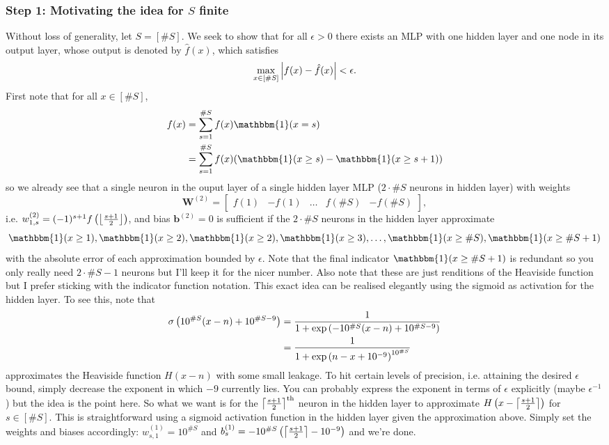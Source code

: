 \documentclass[11pt]{article}
\begin{document}
\subsubsection*{Step 1: Motivating the idea for $S$ finite}
Without loss of generality, let $S=[\#S]$. We seek to show that for all $\epsilon>0$ there exists an MLP with one hidden layer and one node in its output layer, whose output is denoted by $\hat{f}(x)$, which satisfies
$$
\max_{x\in [\#S]}\left|f(x)-\hat{f}(x)\right|<\epsilon.
$$
First note that for all $x\in[\#S]$,
\begin{align*}
f(x)
&=
\sum_{s=1}^{\#S}f(x)\mathbbm{1}(x=s)\\
&=
\sum_{s=1}^{\#S}f(x)(\mathbbm{1}(x\geq s)-\mathbbm{1}(x\geq s+1))
\end{align*}
so we already see that a single neuron in the ouput layer of a single hidden layer MLP ($2\cdot\#S$ neurons in hidden layer) with weights
$$
\mathbf{W}^{(2)}
=
\begin{bmatrix}
    f(1) & -f(1) & \dots & f(\#S) & -f(\#S)
\end{bmatrix},
$$
i.e. $w_{1,s}^{(2)}=(-1)^{s+1}f\left(\left\lfloor\frac{s+1}{2}\right\rfloor\right)$, and bias $\mathbf{b}^{(2)}=0$ is sufficient if the $2\cdot\#S$ neurons in the hidden layer approximate
$$
\mathbbm{1}(x\geq1),\mathbbm{1}(x\geq2),\mathbbm{1}(x\geq2),\mathbbm{1}(x\geq3),\dots,\mathbbm{1}(x\geq\#S),\mathbbm{1}(x\geq\#S+1)
$$
with the absolute error of each approximation bounded by $\epsilon$. Note that the final indicator $\mathbbm{1}(x\geq\#S+1)$ is redundant so you only really need $2\cdot\#S-1$ neurons but I'll keep it for the nicer number. Also note that these are just renditions of the Heaviside function but I prefer sticking with the indicator function notation. This exact idea can be realised elegantly using the sigmoid as activation for the hidden layer. To see this, note that
\begin{align*}
    \sigma\left(10^{\#S}(x-n)+10^{\#S-9}\right)
    &=
    \frac{1}{1+\exp\left(-10^{\#S}(x-n)+10^{\#S-9}\right)}\\
    &=
    \frac{1}{1+\exp\left(n-x+10^{-9}\right)^{10^{\#S}}}
\end{align*}
approximates the Heaviside function $H(x-n)$ with some small leakage. To hit certain levels of precision, i.e. attaining the desired $\epsilon$ bound, simply decrease the exponent in which $-9$ currently lies. You can probably express the exponent in terms of $\epsilon$ explicitly (maybe $\epsilon^{-1}$) but the idea is the point here. So what we want is for the $\left\lceil\frac{s+1}{2}\right\rceil^{\text{th}}$ neuron in the hidden layer to approximate $H\left(x-\left\lceil\frac{s+1}{2}\right\rceil\right)$ for $s\in[\#S]$. This is straightforward using a sigmoid activation function in the hidden layer given the approximation above. Simply set the weights and biases accordingly: $w_{s,1}^{(1)}=10^{\#S}$ and $b_s^{(1)}=-10^{\#S}\left(\left\lceil\frac{s+1}{2}\right\rceil-10^{-9}\right)$ and we're done.
\end{document}
